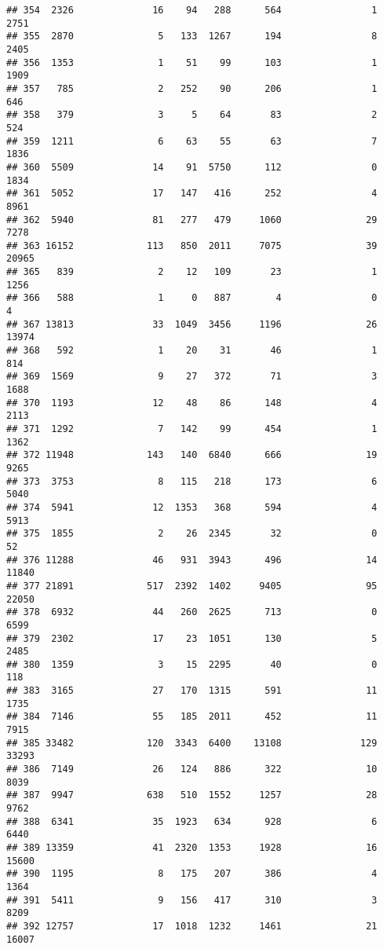\documentclass[
]{article}
\begin{document}
\begin{verbatim}
## 354  2326              16    94   288      564                1  2751
## 355  2870               5   133  1267      194                8  2405
## 356  1353               1    51    99      103                1  1909
## 357   785               2   252    90      206                1   646
## 358   379               3     5    64       83                2   524
## 359  1211               6    63    55       63                7  1836
## 360  5509              14    91  5750      112                0  1834
## 361  5052              17   147   416      252                4  8961
## 362  5940              81   277   479     1060               29  7278
## 363 16152             113   850  2011     7075               39 20965
## 365   839               2    12   109       23                1  1256
## 366   588               1     0   887        4                0     4
## 367 13813              33  1049  3456     1196               26 13974
## 368   592               1    20    31       46                1   814
## 369  1569               9    27   372       71                3  1688
## 370  1193              12    48    86      148                4  2113
## 371  1292               7   142    99      454                1  1362
## 372 11948             143   140  6840      666               19  9265
## 373  3753               8   115   218      173                6  5040
## 374  5941              12  1353   368      594                4  5913
## 375  1855               2    26  2345       32                0    52
## 376 11288              46   931  3943      496               14 11840
## 377 21891             517  2392  1402     9405               95 22050
## 378  6932              44   260  2625      713                0  6599
## 379  2302              17    23  1051      130                5  2485
## 380  1359               3    15  2295       40                0   118
## 383  3165              27   170  1315      591               11  1735
## 384  7146              55   185  2011      452               11  7915
## 385 33482             120  3343  6400    13108              129 33293
## 386  7149              26   124   886      322               10  8039
## 387  9947             638   510  1552     1257               28  9762
## 388  6341              35  1923   634      928                6  6440
## 389 13359              41  2320  1353     1928               16 15600
## 390  1195               8   175   207      386                4  1364
## 391  5411               9   156   417      310                3  8209
## 392 12757              17  1018  1232     1461               21 16007

\end{verbatim}
\end{document}
